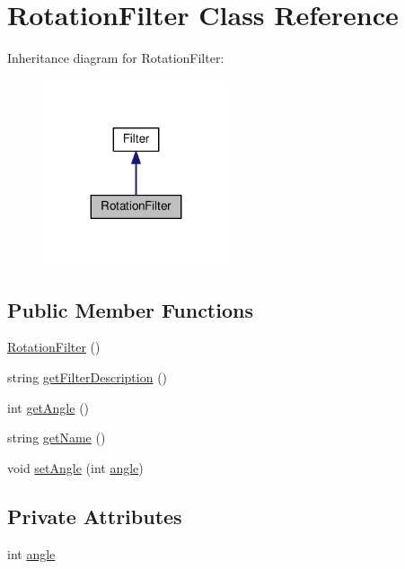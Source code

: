 \hypertarget{classModel_1_1RotationFilter}{}\section{Rotation\+Filter Class Reference}
\label{classModel_1_1RotationFilter}


Inheritance diagram for Rotation\+Filter\+:
\nopagebreak
\begin{figure}[H]
\begin{center}
\leavevmode
\includegraphics[width=155pt]{classModel_1_1RotationFilter__inherit__graph}
\end{center}
\end{figure}
\subsection*{Public Member Functions}
\begin{DoxyCompactItemize}
\item 
\hyperlink{classModel_1_1RotationFilter_a81e4560ff6f30e689b915149f4db871c}{Rotation\+Filter} ()
\item 
string \hyperlink{classModel_1_1RotationFilter_a62b7b60e24f92234393b840b35808e06}{get\+Filter\+Description} ()
\item 
int \hyperlink{classModel_1_1RotationFilter_ae71094a2b50726fbec9d9475b2c92e01}{get\+Angle} ()
\item 
string \hyperlink{classModel_1_1RotationFilter_a11335e13e50af74108bf926dc1340b4b}{get\+Name} ()
\item 
void \hyperlink{classModel_1_1RotationFilter_a241a28cb2a44be5be3440363436be22f}{set\+Angle} (int \hyperlink{classModel_1_1RotationFilter_a63177970cacb40efba67ce501ea89210}{angle})
\end{DoxyCompactItemize}
\subsection*{Private Attributes}
\begin{DoxyCompactItemize}
\item 
int \hyperlink{classModel_1_1RotationFilter_a63177970cacb40efba67ce501ea89210}{angle}
\end{DoxyCompactItemize}
